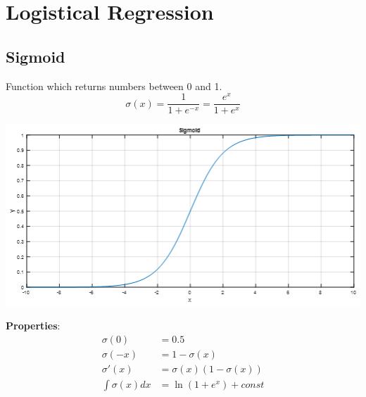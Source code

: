 \section{Logistical Regression}
\subsection{Sigmoid}
Function which returns numbers between 0 and 1.
\[
\sigma(x) = \frac{1}{1 + e^{-x}} = \frac{e^x}{1 + e^x}
\]
\begin{center}
	\includegraphics[width=0.6\columnwidth]{Images/sigmoid}
\end{center}
\textbf{Properties}:
\begin{align*}
	\sigma(0) &= 0.5 \\
	\sigma(-x) &=  1 - \sigma(x)\\
	\sigma'(x) &= \sigma(x)(1 - \sigma(x)) \\
	\int\sigma(x) dx &= \ln(1 + e^x) + const
\end{align*}